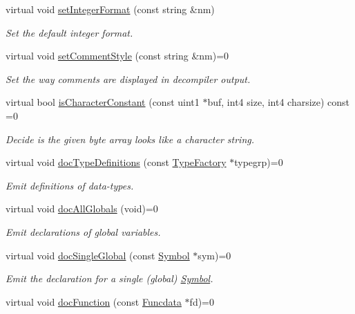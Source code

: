 \begin{DoxyCompactItemize}
virtual void \mbox{\hyperlink{class_print_language_af001882863a1a4a2abefd75e8db5e593}{set\+Integer\+Format}} (const string \&nm)
\begin{DoxyCompactList}\small\item\em Set the default integer format. \end{DoxyCompactList}\item 
virtual void \mbox{\hyperlink{class_print_language_aa9f7b4fbc646531cfe3f9ad571f04ab1}{set\+Comment\+Style}} (const string \&nm)=0
\begin{DoxyCompactList}\small\item\em Set the way comments are displayed in decompiler output. \end{DoxyCompactList}\item 
virtual bool \mbox{\hyperlink{class_print_language_ab2e4b8bb9285afe0bf9e4270c42cd725}{is\+Character\+Constant}} (const uint1 $\ast$buf, int4 size, int4 charsize) const =0
\begin{DoxyCompactList}\small\item\em Decide is the given byte array looks like a character string. \end{DoxyCompactList}\item 
virtual void \mbox{\hyperlink{class_print_language_aea8fdf499dc7cba307e6cf513ed0ccab}{doc\+Type\+Definitions}} (const \mbox{\hyperlink{class_type_factory}{Type\+Factory}} $\ast$typegrp)=0
\begin{DoxyCompactList}\small\item\em Emit definitions of data-\/types. \end{DoxyCompactList}\item 
virtual void \mbox{\hyperlink{class_print_language_a3fbbabf7a0a2f67e02b49d895db04fa9}{doc\+All\+Globals}} (void)=0
\begin{DoxyCompactList}\small\item\em Emit declarations of global variables. \end{DoxyCompactList}\item 
virtual void \mbox{\hyperlink{class_print_language_a2139aedceedf891b5702c0da1d905f08}{doc\+Single\+Global}} (const \mbox{\hyperlink{class_symbol}{Symbol}} $\ast$sym)=0
\begin{DoxyCompactList}\small\item\em Emit the declaration for a single (global) \mbox{\hyperlink{class_symbol}{Symbol}}. \end{DoxyCompactList}\item 
virtual void \mbox{\hyperlink{class_print_language_a93ebbf4cf20c65236ffca078fd5cbc21}{doc\+Function}} (const \mbox{\hyperlink{class_funcdata}{Funcdata}} $\ast$fd)=0

\end{DoxyCompactItemize}
